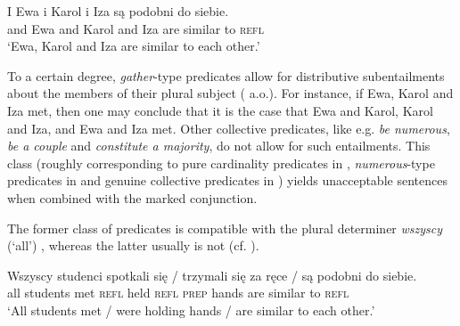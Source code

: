 \documentclass[output=paper]{langscibook}
\begin{document}
\ea\label{ros:similar} \gll  I Ewa i Karol i Iza są podobni do siebie. \\
and Ewa and Karol and Iza are similar to \textsc{refl} \\
\glt `Ewa, Karol and Iza are similar to each other.' 
\z

\noindent To a certain degree, \textit{gather}-type predicates allow for distributive subentailments about the members of their plural subject (\citealt{Dowty:1987, Winter:2002, Hackl:2002, Champollion:2010} a.o.). For instance, if Ewa, Karol and Iza met, then one may conclude that it is the case that Ewa and Karol, Karol and Iza, and Ewa and Iza met. Other collective predicates, like e.g. \textit{be numerous}, \textit{be a couple} and \textit{constitute a majority}, do not allow for such entailments. This class (roughly corresponding to pure cardinality predicates in \citealt{Dowty:1987}{,} \textit{numerous}-type predicates in \citealt{Champollion:2010} and genuine collective predicates in \citealt{Hackl:2002}) yields unacceptable sentences when combined with the marked conjunction.

\label{ros:num}
\z 

\label{ros:couple} 
\z 

\label{ros:majority} 
\z 

\noindent The former class of predicates is compatible with the plural determiner \textit{wszyscy} (`all') , whereas the latter usually is not  (cf. \citealt{Dowty:1987}).

\ea\label{ros:all1} \gll  Wszyscy studenci spotkali się / trzymali się za ręce / są podobni do siebie. \\
all students  met \textsc{refl} {} held \textsc{refl} \textsc{prep} hands {} are similar to \textsc{refl}  \\
\glt `All students met / were holding hands / are similar to each other.' 
\z
\end{document}
